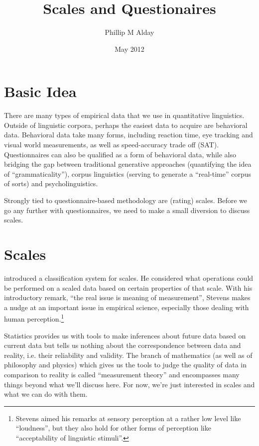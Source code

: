 \documentclass[a4paper,12pt,oneside,leqno]{scrartcl}%
\title{Scales and Questionaires}
\author{Phillip M Alday}
\date{May 2012}
\begin{document}
\newtheorem{pos}{Postulate}[section]
\newtheorem{thm}{Theorem}[section]
\newtheorem{lem}{Lemma}[section]

\theoremstyle{definition}
\newtheorem{defn}{Definition}
\newtheorem*{definition}{Definition}

\maketitle

\section{Basic Idea}
There are many types of empirical data that we use in quantitative linguistics.  
Outside of linguistic corpora, perhaps the easiest data to acquire are behavioral data.  
Behavioral data take many forms, including reaction time, eye tracking and visual world measurements, as well as speed-accuracy trade off (SAT).
Questionnaires can also be qualified as a form of behavioral data, while also bridging the gap between traditional generative approaches (quantifying the idea of ``grammaticality''), corpus linguistics (serving to generate a ``real-time'' corpus of sorts) and psycholinguistics.

Strongly tied to questionnaire-based methodology are (rating) scales.  
Before we go any further with questionnaires, we need to make a small diversion to discuss scales.

 \section{Scales}
 \citet{stevens1946a} introduced a classification system for scales. 
 He considered what operations could be performed on a scaled data based on certain properties of that scale.
 With his introductory remark, ``the real issue is meaning of measurement'', Stevens makes a nudge at an important issue in empirical science, especially those dealing with human perception.\footnote{Stevens aimed his remarks at sensory perception at a rather low level like ``loudness'', but they also hold for other forms of perception like ``acceptability of linguistic stimuli''.}
 
 Statistics provides us with tools to make inferences about future data based on current data but tells us nothing about the correspondence between data and reality, i.e. their reliability and validity. 
 The branch of mathematics (as well as of philosophy and physics) which gives us the tools to judge the quality of data in comparison to reality is called ``measurement theory'' and encompasses many things beyond what we'll discuss here.
For now, we're just interested in scales and what we can do with them.  
\end{document}
